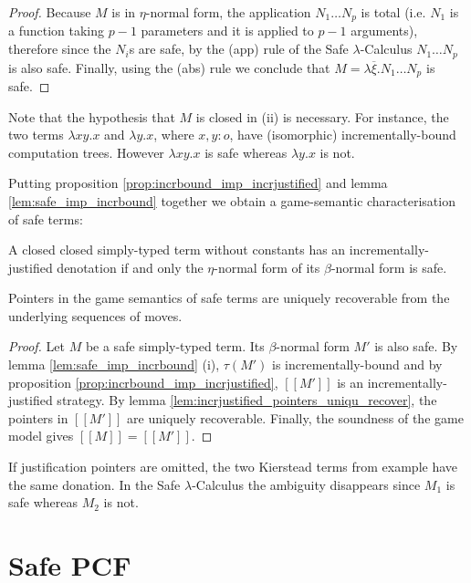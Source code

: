 \documentclass{llncs}
\newcommand{\sem}[1]{{[\![ #1 ]\!]}}
\newcommand\pcf{\textsf{PCF}}
\begin{document}
\begin{proof}
Because $M$ is in $\eta$-normal form, the application $N_1 \ldots
N_p$ is total (i.e. $N_1$ is a function taking $p-1$ parameters and
it is applied to $p-1$ arguments), therefore since the $N_i$s are
safe, by the (app) rule of the Safe $\lambda$-Calculus $N_1 \ldots
N_p$ is also safe. Finally, using the (abs) rule we conclude that $M
= \lambda \overline{\xi} . N_1 \ldots N_p$ is safe.
\end{proof}

Note that the hypothesis that $M$ is closed in (ii) is necessary.
For instance, the two terms $\lambda x y .x$ and $\lambda y . x$,
where $x,y:o$, have (isomorphic) incrementally-bound computation
trees. However $\lambda x y .x$ is safe whereas $\lambda y . x$ is
not.



Putting proposition \ref{prop:incrbound_imp_incrjustified} and lemma
\ref{lem:safe_imp_incrbound} together we obtain a game-semantic
characterisation of safe terms:
\begin{corollary}
A closed closed simply-typed term without constants has an
incrementally-justified denotation if and only the $\eta$-normal form of
its $\beta$-normal form is safe.
\end{corollary}

\begin{theorem}
\label{thm:safe_ptr_recoverable} Pointers in the game semantics of
safe terms are uniquely recoverable from the underlying sequences of moves.
\end{theorem}
\begin{proof}
Let $M$ be a safe simply-typed term. Its $\beta$-normal form $M'$
is also safe. By lemma \ref{lem:safe_imp_incrbound}
(i), $\tau(M')$ is incrementally-bound and by proposition
\ref{prop:incrbound_imp_incrjustified}, $\sem{M'}$ is an
incrementally-justified strategy. By lemma
\ref{lem:incrjustified_pointers_uniqu_recover}, the pointers in
$\sem{M'}$ are uniquely recoverable. Finally, the soundness of the
game model gives $\sem{M} = \sem{M'}$.
\end{proof}

\begin{example} If justification pointers are omitted, the two Kierstead terms from example \label{ex:kierstead} have 
the same donation. In the Safe $\lambda$-Calculus the ambiguity disappears since $M_1$ is safe whereas $M_2$ is not.
\end{example}


\section{Safe \pcf}
\end{document}
